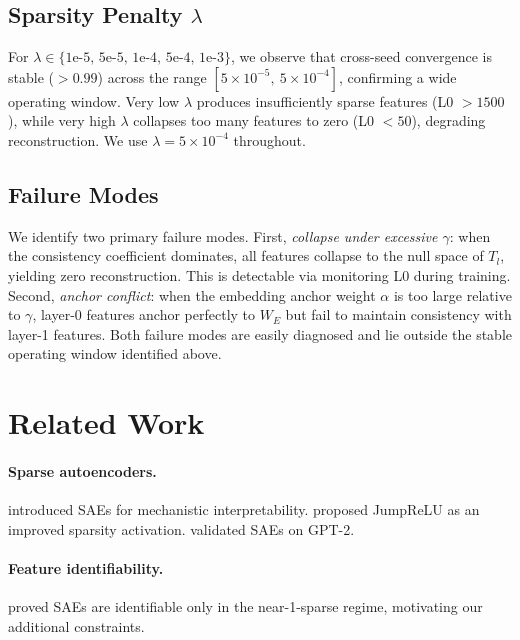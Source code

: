 \documentclass[12pt,a4paper]{article}
\begin{document}
\subsection{Sparsity Penalty $\lambda$}

For $\lambda \in \{\text{1e-5, 5e-5, 1e-4, 5e-4, 1e-3}\}$, we observe that cross-seed convergence is stable (${>}0.99$) across the range $[5 \times 10^{-5},\ 5 \times 10^{-4}]$, confirming a wide operating window. Very low $\lambda$ produces insufficiently sparse features (L0 $> 1500$), while very high $\lambda$ collapses too many features to zero (L0 $< 50$), degrading reconstruction. We use $\lambda = 5 \times 10^{-4}$ throughout.

\subsection{Failure Modes}

We identify two primary failure modes. First, \textit{collapse under excessive $\gamma$}: when the consistency coefficient dominates, all features collapse to the null space of $T_l$, yielding zero reconstruction. This is detectable via monitoring L0 during training. Second, \textit{anchor conflict}: when the embedding anchor weight $\alpha$ is too large relative to $\gamma$, layer-0 features anchor perfectly to $W_E$ but fail to maintain consistency with layer-1 features. Both failure modes are easily diagnosed and lie outside the stable operating window identified above.

\section{Related Work}
\label{sec:related}

\paragraph{Sparse autoencoders.}
\citet{bricken2023monosemanticity} introduced SAEs for mechanistic interpretability.
\citet{rajamanoharan2024improving} proposed JumpReLU as an improved sparsity
activation. \citet{cunningham2023sparse} validated SAEs on GPT-2.

\paragraph{Feature identifiability.}
\citet{cui2024identifiable} proved SAEs are identifiable only in the near-1-sparse
regime, motivating our additional constraints.
\end{document}
